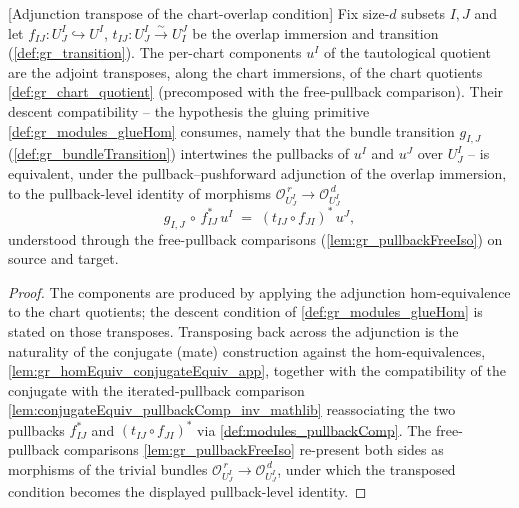\begin{lemma}

[Adjunction transpose of the chart-overlap condition]
  \label{lem:gr_tautologicalQuotientComponent_transpose}
  Fix size-\(d\) subsets \(I, J\) and let \(f_{IJ} : U^I_J \hookrightarrow U^I\),
  \(t_{IJ} : U^I_J \xrightarrow{\sim} U^J_I\) be the overlap immersion and transition
  (\cref{def:gr_transition}). The per-chart components \(u^I\) of the tautological quotient
  are the adjoint transposes, along the chart immersions, of the chart quotients
  \cref{def:gr_chart_quotient} (precomposed with the free-pullback comparison). Their
  descent compatibility -- the hypothesis the gluing primitive \cref{def:gr_modules_glueHom}
  consumes, namely that the bundle transition \(g_{I,J}\) (\cref{def:gr_bundleTransition})
  intertwines the pullbacks of \(u^I\) and \(u^J\) over \(U^I_J\) -- is equivalent, under the
  pullback--pushforward adjunction of the overlap immersion, to the pullback-level identity
  of morphisms \(\mathcal{O}_{U^I_J}^{\,r} \to \mathcal{O}_{U^I_J}^{\,d}\)
  \[
    g_{I,J} \,\circ\, f_{IJ}^{*}\,u^I
      \;=\; (t_{IJ} \circ f_{JI})^{*}\,u^J,
  \]
  understood through the free-pullback comparisons (\cref{lem:gr_pullbackFreeIso}) on
  source and target.
\end{lemma}
\begin{proof}
  The components are produced by applying the adjunction hom-equivalence to the chart
  quotients; the descent condition of \cref{def:gr_modules_glueHom} is stated on those
  transposes. Transposing back across the adjunction is the naturality of the conjugate
  (mate) construction against the hom-equivalences, \cref{lem:gr_homEquiv_conjugateEquiv_app},
  together with the compatibility of the conjugate with the iterated-pullback comparison
  \cref{lem:conjugateEquiv_pullbackComp_inv_mathlib} reassociating the two pullbacks
  \(f_{IJ}^{*}\) and \((t_{IJ}\circ f_{JI})^{*}\) via \cref{def:modules_pullbackComp}. The
  free-pullback comparisons \cref{lem:gr_pullbackFreeIso} re-present both sides as morphisms
  of the trivial bundles \(\mathcal{O}_{U^I_J}^{\,r} \to \mathcal{O}_{U^I_J}^{\,d}\), under
  which the transposed condition becomes the displayed pullback-level identity.
\end{proof}

